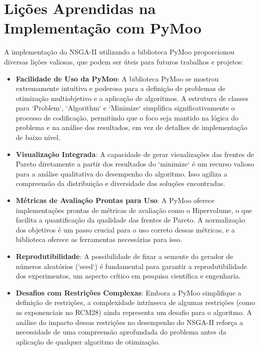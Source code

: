 \documentclass[12pt,openright,oneside,a4paper,english,brazil]{abntex2}
\begin{document}
\section*{Lições Aprendidas na Implementação com PyMoo}
A implementação do NSGA-II utilizando a biblioteca PyMoo proporcionou diversas lições valiosas, que podem ser úteis para futuros trabalhos e projetos:
\begin{itemize}
    \item \textbf{Facilidade de Uso da PyMoo}: A biblioteca PyMoo se mostrou extremamente intuitiva e poderosa para a definição de problemas de otimização multiobjetivo e a aplicação de algoritmos. A estrutura de classes para `Problem`, `Algorithm` e `Minimize` simplifica significativamente o processo de codificação, permitindo que o foco seja mantido na lógica do problema e na análise dos resultados, em vez de detalhes de implementação de baixo nível.
    \item \textbf{Visualização Integrada}: A capacidade de gerar visualizações das frentes de Pareto diretamente a partir dos resultados do `minimize` é um recurso valioso para a análise qualitativa do desempenho do algoritmo. Isso agiliza a compreensão da distribuição e diversidade das soluções encontradas.
    \item \textbf{Métricas de Avaliação Prontas para Uso}: A PyMoo oferece implementações prontas de métricas de avaliação como o Hipervolume, o que facilita a quantificação da qualidade das frentes de Pareto. A normalização dos objetivos é um passo crucial para o uso correto dessas métricas, e a biblioteca oferece as ferramentas necessárias para isso.
    \item \textbf{Reprodutibilidade}: A possibilidade de fixar a semente do gerador de números aleatórios (`seed`) é fundamental para garantir a reprodutibilidade dos experimentos, um aspecto crítico em pesquisa científica e engenharia.
    \item \textbf{Desafios com Restrições Complexas}: Embora a PyMoo simplifique a definição de restrições, a complexidade intrínseca de algumas restrições (como as exponenciais no RCM28) ainda representa um desafio para o algoritmo. A análise do impacto dessas restrições no desempenho do NSGA-II reforça a necessidade de uma compreensão aprofundada do problema antes da aplicação de qualquer algoritmo de otimização.
\end{itemize}




\appendix
\end{document}
